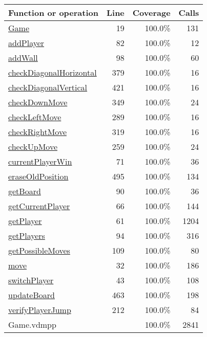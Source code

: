 \begin{longtable}{|l|r|r|r|}
\hline
Function or operation & Line & Coverage & Calls \\
\hline
\hline
\hyperref[Game:19]{Game} & 19&100.0\% & 131 \\
\hline
\hyperref[addPlayer:82]{addPlayer} & 82&100.0\% & 12 \\
\hline
\hyperref[addWall:98]{addWall} & 98&100.0\% & 60 \\
\hline
\hyperref[checkDiagonalHorizontal:379]{checkDiagonalHorizontal} & 379&100.0\% & 16 \\
\hline
\hyperref[checkDiagonalVertical:421]{checkDiagonalVertical} & 421&100.0\% & 16 \\
\hline
\hyperref[checkDownMove:349]{checkDownMove} & 349&100.0\% & 24 \\
\hline
\hyperref[checkLeftMove:289]{checkLeftMove} & 289&100.0\% & 16 \\
\hline
\hyperref[checkRightMove:319]{checkRightMove} & 319&100.0\% & 16 \\
\hline
\hyperref[checkUpMove:259]{checkUpMove} & 259&100.0\% & 24 \\
\hline
\hyperref[currentPlayerWin:71]{currentPlayerWin} & 71&100.0\% & 36 \\
\hline
\hyperref[eraseOldPosition:495]{eraseOldPosition} & 495&100.0\% & 134 \\
\hline
\hyperref[getBoard:90]{getBoard} & 90&100.0\% & 36 \\
\hline
\hyperref[getCurrentPlayer:66]{getCurrentPlayer} & 66&100.0\% & 144 \\
\hline
\hyperref[getPlayer:61]{getPlayer} & 61&100.0\% & 1204 \\
\hline
\hyperref[getPlayers:94]{getPlayers} & 94&100.0\% & 316 \\
\hline
\hyperref[getPossibleMoves:109]{getPossibleMoves} & 109&100.0\% & 80 \\
\hline
\hyperref[move:32]{move} & 32&100.0\% & 186 \\
\hline
\hyperref[switchPlayer:43]{switchPlayer} & 43&100.0\% & 108 \\
\hline
\hyperref[updateBoard:463]{updateBoard} & 463&100.0\% & 198 \\
\hline
\hyperref[verifyPlayerJump:212]{verifyPlayerJump} & 212&100.0\% & 84 \\
\hline
\hline
Game.vdmpp & & 100.0\% & 2841 \\
\hline
\end{longtable}

